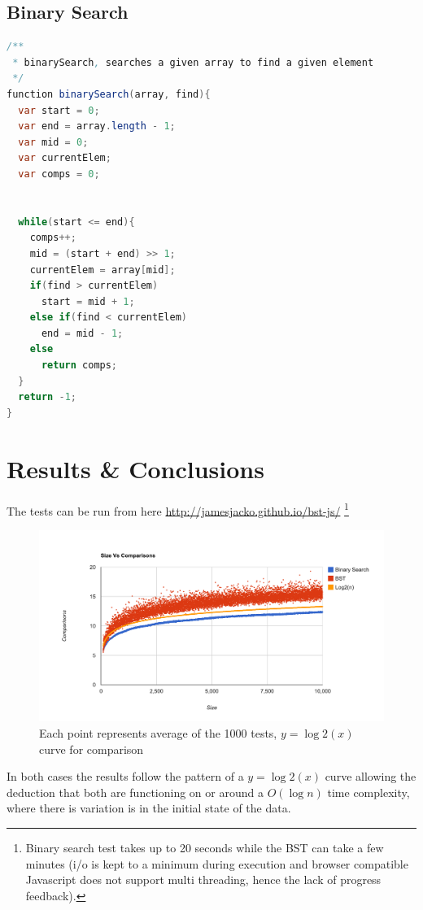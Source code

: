\documentclass[pdftex,a4paper,10pt,titlepage]{article}
\begin{document}
\subsection{Binary Search}
\begin{lstlisting}[language=java,frame=single]
/**
 * binarySearch, searches a given array to find a given element
 */
function binarySearch(array, find){
  var start = 0;
  var end = array.length - 1;
  var mid = 0;
  var currentElem;
  var comps = 0;


  while(start <= end){
    comps++;
    mid = (start + end) >> 1;
    currentElem = array[mid];
    if(find > currentElem)
      start = mid + 1;
    else if(find < currentElem)
      end = mid - 1;
    else
      return comps;
  }
  return -1;
}
\end{lstlisting}

\pagebreak
\section{Results \& Conclusions}

The tests can be run from here \url{http://jamesjacko.github.io/bst-js/} \footnote{Binary search test takes up to 20 seconds while the BST can take a few minutes (i/o is kept to a minimum during execution and browser compatible Javascript does not support multi threading, hence the lack of progress feedback).}
\begin{figure}
\includegraphics[width=\textwidth]{chart}
\caption{Each point represents average of the 1000 tests, $y = \log{2}(x)$ curve for comparison}
\label{fig:Study Output}
\end{figure}

In both cases the results follow the pattern of a $y = \log{2}(x)$ curve allowing the deduction that both are functioning on or around a $O(\log{}n)$ time complexity, where there is variation is in the initial state of the data. 
\end{document}
